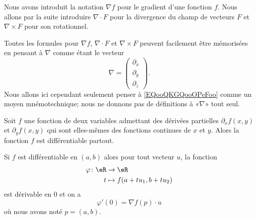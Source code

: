 \begin{remark}
    Nous avons introduit la notation \( \nabla f\) pour le gradient d'une fonction \( f\). Nous allons par la suite introduire \( \nabla\cdot F\) pour la divergence du champ de vecteurs \( F\) et \( \nabla\times F\) pour son rotationnel.

    Toutes les formules pour \( \nabla f\), \( \nabla\cdot F\) et \( \nabla\times F\) peuvent facilement être mémorisées en pensant à \( \nabla\) comme étant le vecteur
    \begin{equation}        \label{EQooQKGQooOPeFoo}
        \nabla=\begin{pmatrix}
            \partial_x    \\ 
            \partial_y    \\ 
            \partial_z    
        \end{pmatrix}.
    \end{equation}
    Nous allons ici cependant seulement penser à \eqref{EQooQKGQooOPeFoo} comme un moyen mnémotechnique; nous ne donnons pas de définitions à «\( \nabla\)» tout seul.
\end{remark}

\begin{proposition} \label{PropExistDiffDeux}
    Soit $f$ une fonction de deux variables admettant des dérivées partielles $\partial_xf(x,y)$ et $\partial_yf(x,y)$ qui sont elles-mêmes des fonctions continues de $x$ et $y$. Alors la fonction $f$ est différentiable partout.
\end{proposition}

\begin{proposition}
    Si $f$ est différentiable en $(a,b)$ alors pour tout vecteur \( u\), la fonction
    \begin{equation}
        \begin{aligned}
            \varphi\colon \eR&\to \eR \\
            t&\mapsto   f(a+tu_1,b+tu_2)
        \end{aligned}
    \end{equation}
    est dérivable en $0$ et on a
    \begin{equation}
        \varphi'(0)=\nabla f(p)\cdot u
    \end{equation}
    où nous avons noté $p=(a,b)$.
\end{proposition}

